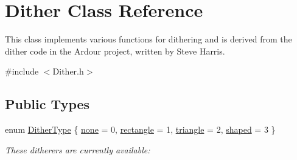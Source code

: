 \hypertarget{class_dither}{}\section{Dither Class Reference}
\label{class_dither}


This class implements various functions for dithering and is derived from the dither code in the Ardour project, written by Steve Harris.  




{\ttfamily \#include $<$Dither.\+h$>$}

\subsection*{Public Types}
\begin{DoxyCompactItemize}
\item 
enum \hyperlink{class_dither_adea8077a2ba5a6c4ad2f11ed20cd4086}{Dither\+Type} \{ \hyperlink{class_dither_adea8077a2ba5a6c4ad2f11ed20cd4086ab2f6eaa06d9f79958f282ba62ea96847}{none} = 0, 
\hyperlink{class_dither_adea8077a2ba5a6c4ad2f11ed20cd4086ad020f87518df3c744151879bf184fae9}{rectangle} = 1, 
\hyperlink{class_dither_adea8077a2ba5a6c4ad2f11ed20cd4086a821f5379115ed0e0bfebe7723e707b63}{triangle} = 2, 
\hyperlink{class_dither_adea8077a2ba5a6c4ad2f11ed20cd4086a607d818d7eea1ee97cfa38949cf9203b}{shaped} = 3
 \}\begin{DoxyCompactList}\small\item\em These ditherers are currently available\+: \end{DoxyCompactList}
\end{DoxyCompactItemize}
